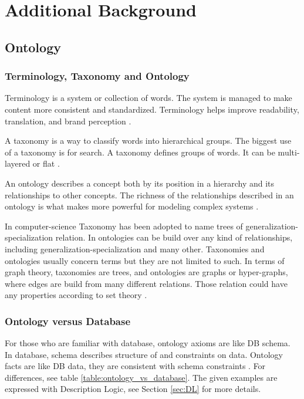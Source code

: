 \chapter{Additional Background}
\section{Ontology}
\subsection{Terminology, Taxonomy and Ontology}
Terminology is a system or collection of words. The system is managed to make content more consistent and standardized. Terminology helps improve readability, translation, and brand perception \cite{TaxonomyVSTerminology}.

A taxonomy is a way to classify words into hierarchical groups. The biggest use of a taxonomy is for search.
A taxonomy defines groups of words. It can be multi-layered or flat \cite{TaxonomyVSTerminology}.

An ontology describes a concept both by its position in a hierarchy and its relationships to other concepts. The richness of the relationships described in an ontology is what makes more powerful for modeling complex systems \cite{OntologyHasRicherRelationshipThanTaxonomy}.

In computer-science Taxonomy has been adopted to name trees of generalization-specialization relation. In ontologies can be build over any kind of relationships, including generalization-specialization and many other.
Taxonomies and ontologies usually concern terms but they are not limited to such. In terms of graph theory, taxonomies are trees, and ontologies are graphs or hyper-graphs, where edges are build from many different relations. Those relation could have any properties according to set theory \cite{taxonomiesRtreesOntologiesRgraphs}.

\subsection{Ontology versus Database}

For those who are familiar with database, ontology axioms are like DB schema.
In database, schema describes structure of and constraints on data.
Ontology facts are like DB data, they are consistent with schema constraints \cite{OntologyLanguageTool2}.
For differences, see table \ref{table:ontology_vs_database}. 
The given examples are expressed with Description Logic, see Section \ref{sec:DL} for more details.

